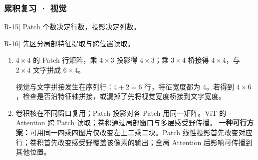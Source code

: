\subsubsection*{累积复习 · 视觉}
\begin{answerhints}
\item[\hyperref[exercise:review-image-token-shapes]{R-15}] \leavevmode{}\label{hint:review-image-token-shapes}Patch 个数决定行数，投影决定列数。
\item[\hyperref[exercise:review-vision-sharing]{R-16}] \leavevmode{}\label{hint:review-vision-sharing}先区分局部特征提取与跨位置读取。
\end{answerhints}
\begin{enumerate}[label={},leftmargin=4.8em,itemsep=4pt]
\item[\textbf{\hyperref[exercise:review-image-token-shapes]{R-15.}}] \leavevmode{}\label{solution:R-15}\label{solution:review-image-token-shapes}$4\times4$ 的 Patch 行矩阵，乘 $4\times3$ 投影得 $4\times3$；乘 $3\times4$ 桥接得 $4\times4$，与 $2\times4$ 文字拼成 $6\times4$。\par 视觉与文字拼接发生在序列行：$4+2=6$ 行，特征宽度都为 $4$。若得到 $4\times6$，检查是否沿特征轴拼接，或漏掉了先将视觉宽度桥接到文字宽度。
\item[\textbf{\hyperref[exercise:review-vision-sharing]{R-16.}}] \leavevmode{}\label{solution:R-16}\label{solution:review-vision-sharing}卷积核在不同窗口复用；Patch 投影对各 Patch 用同一矩阵。ViT 的 Attention 跨 Patch 读取；卷积通过局部窗口与多层感受野传播。
\textbf{一种可行方案：}可用同一四乘四图片仅改变左上二乘二块。Patch 线性投影首先改变对应行；卷积首先改变感受野覆盖该像素的输出；全局 Attention 后影响可传播到其他位置。
\end{enumerate}
